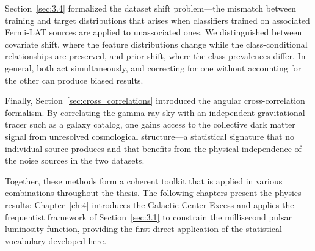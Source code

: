 Section~\ref{sec:3.4} formalized the dataset shift problem---the mismatch between training and target distributions that arises when classifiers trained on associated Fermi-LAT sources are applied to unassociated ones.
We distinguished between covariate shift, where the feature distributions change while the class-conditional relationships are preserved, and prior shift, where the class prevalences differ.
In general, both act simultaneously, and correcting for one without accounting for the other can produce biased results.

Finally, Section~\ref{sec:cross_correlations} introduced the angular cross-correlation formalism.
By correlating the gamma-ray sky with an independent gravitational tracer such as a galaxy catalog, one gains access to the collective dark matter signal from unresolved cosmological structure---a statistical signature that no individual source produces and that benefits from the physical independence of the noise sources in the two datasets.

Together, these methods form a coherent toolkit that is applied in various combinations throughout the thesis.
The following chapters present the physics results: Chapter~\ref{ch:4} introduces the Galactic Center Excess and applies the frequentist framework of Section~\ref{sec:3.1} to constrain the millisecond pulsar luminosity function, providing the first direct application of the statistical vocabulary developed here.
